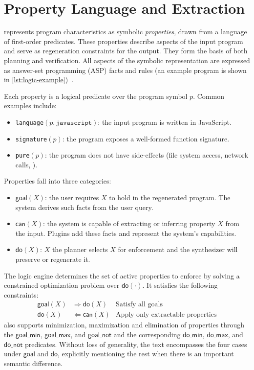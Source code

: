 \documentclass[a4paper,twoside,12pt]{report} %
\begin{document}
\chapter{Property Language and Extraction}
\label{sec:dsl}

\sys represents program characteristics as symbolic \emph{properties}, drawn from a language of first-order predicates.
These properties describe aspects of the input program and serve as regeneration constraints for the output.
They form the basis of both planning and verification.
All aspects of the symbolic representation are expressed as answer-set programming (ASP) facts and rules (an example program is shown in \cref{lst:logic-example})~\cite{Eiter_2009}.

Each property is a logical predicate over the program symbol $p$. Common examples include:
\begin{itemize}
  \item \texttt{language}$(p, \texttt{javascript})$: the input program is written in JavaScript.
  \item \texttt{signature}$(p)$: the program exposes a well-formed function signature.
  \item \texttt{pure}$(p)$: the program does not have side-effects (\eg file system access, network calls, \etc).
\end{itemize}

Properties fall into three categories:
\begin{itemize}
  \item $\mathsf{goal}(X)$: the user requires $X$ to hold in the regenerated program. The system derives such facts from the user query.
  \item $\mathsf{can}(X)$: the system is capable of extracting or inferring property $X$ from the input. Plugins add these facts and represent the system's capabilities.
  \item $\mathsf{do}(X)$: $X$ the planner selects $X$ for enforcement and the synthesizer will preserve or regenerate it. 
\end{itemize}

The logic engine determines the set of active properties to enforce by solving a constrained optimization problem over $\mathsf{do}(\cdot)$. It satisfies the following constraints:
\begin{align*}
  \mathsf{goal}(X) &\Rightarrow \mathsf{do}(X) &\text{Satisfy all goals} \\
  \mathsf{do}(X) &\Leftarrow \mathsf{can}(X) &\text{Apply only extractable properties}
\end{align*}
\sys also supports minimization, maximization and elimination of properties
through the $\mathsf{goal\_min}$, $\mathsf{goal\_max}$, and $\mathsf{goal\_not}$ and the corresponding $\mathsf{do\_min}$, $\mathsf{do\_max}$, and $\mathsf{do\_not}$ predicates.
Without loss of generality, the text encompasses the four cases under $\mathsf{goal}$ and $\mathsf{do}$, explicitly mentioning the rest when there is an important semantic difference.
\end{document}
